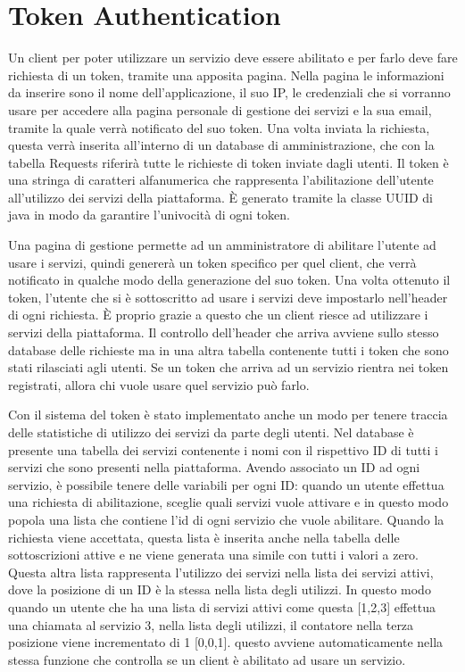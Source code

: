 \section{Token Authentication}
Un client per poter utilizzare un servizio deve essere abilitato e per farlo deve fare richiesta di un token, tramite una apposita pagina. Nella pagina le informazioni da inserire sono il nome dell’applicazione, il suo IP, le credenziali che si vorranno usare per accedere alla pagina personale di gestione dei servizi e la sua email, tramite la quale verrà notificato del suo token. Una volta inviata la richiesta, questa verrà inserita all’interno di un database di amministrazione, che con la tabella Requests riferirà tutte le richieste di token inviate dagli utenti. Il token è una stringa di caratteri alfanumerica che rappresenta l’abilitazione dell’utente all’utilizzo dei servizi della piattaforma. È generato tramite la classe UUID di java in modo da garantire l’univocità di ogni token.
\par
Una pagina di gestione permette ad un amministratore di abilitare l’utente ad usare i servizi, quindi genererà un token specifico per quel client, che verrà notificato in qualche modo della generazione del suo token.
Una volta ottenuto il token, l’utente che si è sottoscritto ad usare i servizi deve impostarlo nell’header di ogni richiesta. È proprio grazie a questo che un client riesce ad utilizzare i servizi della piattaforma. Il controllo dell’header che arriva avviene sullo stesso database delle richieste ma in una altra tabella contenente tutti i token che sono stati rilasciati agli utenti. Se un token che arriva ad un servizio rientra nei token registrati, allora chi vuole usare quel servizio può farlo.
\par
Con il sistema del token è stato implementato anche un modo per tenere traccia delle statistiche di utilizzo dei servizi da parte degli utenti. Nel database è presente una tabella dei servizi contenente i nomi con il rispettivo ID di tutti i servizi che sono presenti nella piattaforma. Avendo associato un ID ad ogni servizio, è possibile tenere delle variabili per ogni ID: quando un utente effettua una richiesta di abilitazione, sceglie quali servizi vuole attivare e in questo modo popola una lista che contiene l’id di ogni servizio che vuole abilitare. Quando la richiesta viene accettata, questa lista è inserita anche nella tabella delle sottoscrizioni attive e ne viene generata una simile con tutti i valori a zero. Questa altra lista rappresenta l’utilizzo dei servizi nella lista dei servizi attivi, dove la posizione di un ID è la stessa nella lista degli utilizzi. In questo modo quando un utente che ha una lista di servizi attivi come questa [1,2,3] effettua una chiamata al servizio 3, nella lista degli utilizzi, il contatore nella terza posizione viene incrementato di 1 [0,0,1]. questo avviene automaticamente nella stessa funzione che controlla se un client è abilitato ad usare un servizio.
\clearpage
